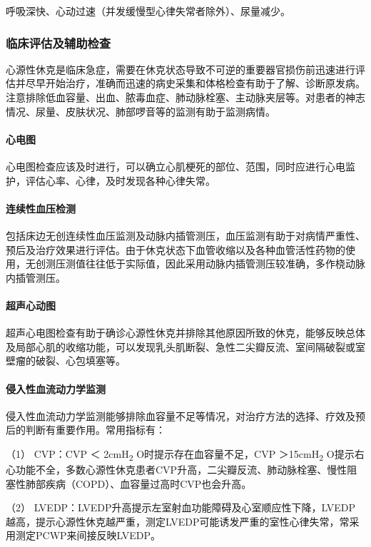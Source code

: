 呼吸深快、心动过速（并发缓慢型心律失常者除外）、尿量减少。

\subsubsection{临床评估及辅助检查}

心源性休克是临床急症，需要在休克状态导致不可逆的重要器官损伤前迅速进行评估并尽早开始治疗，准确而迅速的病史采集和体格检查有助于了解、诊断原发病。注意排除低血容量、出血、脓毒血症、肺动脉栓塞、主动脉夹层等。对患者的神志情况、尿量、皮肤状况、肺部啰音等的监测有助于监测病情。

\paragraph{心电图}

心电图检查应该及时进行，可以确立心肌梗死的部位、范围，同时应进行心电监护，评估心率、心律，及时发现各种心律失常。

\paragraph{连续性血压检测}

包括床边无创连续性血压监测及动脉内插管测压，血压监测有助于对病情严重性、预后及治疗效果进行评估。由于休克状态下血管收缩以及各种血管活性药物的使用，无创测压测值往往低于实际值，因此采用动脉内插管测压较准确，多作桡动脉内插管测压。

\paragraph{超声心动图}

超声心电图检查有助于确诊心源性休克并排除其他原因所致的休克，能够反映总体及局部心肌的收缩功能，可以发现乳头肌断裂、急性二尖瓣反流、室间隔破裂或室壁瘤的破裂、心包填塞等。

\paragraph{侵入性血流动力学监测}

侵入性血流动力学监测能够排除血容量不足等情况，对治疗方法的选择、疗效及预后的判断有重要作用。常用指标有：

（1） CVP：CVP ＜ 2cmH\textsubscript{2} O时提示存在血容量不足，CVP
＞15cmH\textsubscript{2}
O提示右心功能不全，多数心源性休克患者CVP升高，二尖瓣反流、肺动脉栓塞、慢性阻塞性肺部疾病（COPD）、血容量过高时CVP也会升高。

（2）
LVEDP：LVEDP升高提示左室射血功能障碍及心室顺应性下降，LVEDP越高，提示心源性休克越严重，测定LVEDP可能诱发严重的室性心律失常，常采用测定PCWP来间接反映LVEDP。

